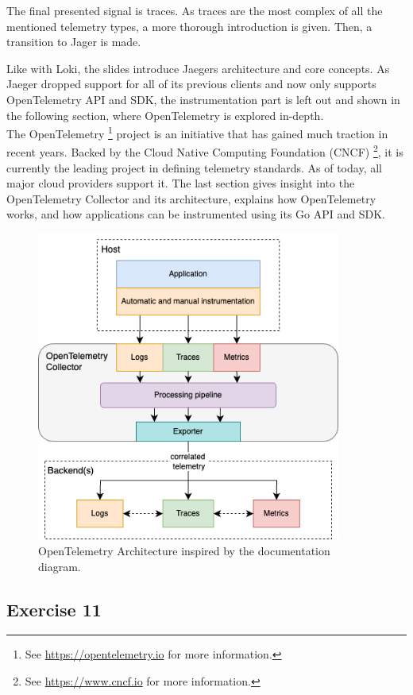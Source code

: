 \documentclass[
  digital,
  color,
  oneside,
  nosansbold,
  nocolorbold,
  lof,
  lot,
]{fithesis4}
\begin{document}
The final presented signal is traces. As traces are the most complex of all the mentioned telemetry types, a more thorough introduction is given. Then, a transition to Jager is made.

Like with Loki, the slides introduce Jaegers architecture and core concepts. As Jaeger dropped support for all of its previous clients and now only supports OpenTelemetry API and SDK, the instrumentation part is left out and shown in the following section, where OpenTelemetry is explored in-depth. \\

The OpenTelemetry 
\footnote{See \url{https://opentelemetry.io} for more information.}
project is an initiative that has gained much traction in recent years. Backed by the Cloud Native Computing Foundation (CNCF)
\footnote{See \url{https://www.cncf.io} for more information.},
it is currently the leading project in defining telemetry standards. As of today, all major cloud providers support it. The last section gives insight into the OpenTelemetry Collector and its architecture, explains how OpenTelemetry works, and how applications can be instrumented using its Go API and SDK.

\begin{figure}[H]
    \centering
    \includegraphics[width=10cm]{figures/opentelemetry-architecture.png}
    \caption{OpenTelemetry Architecture inspired by the documentation diagram.}
\end{figure}

\subsection{Exercise 11}
\end{document}
